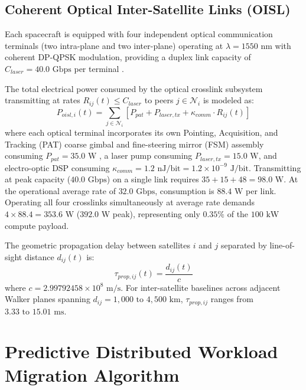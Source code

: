 \documentclass[journal]{IEEEtran}
\begin{document}
\subsection{Coherent Optical Inter-Satellite Links (OISL)}
Each spacecraft is equipped with four independent optical communication terminals (two intra-plane and two inter-plane) operating at $\lambda = 1550\text{ nm}$ with coherent DP-QPSK modulation, providing a duplex link capacity of $C_{laser} = 40.0\text{ Gbps}$ per terminal \cite{chaudhry2021laser, kaushal2017optical, artiga2025targeting, chaudhry2022optical, zhu2022laser}.

The total electrical power consumed by the optical crosslink subsystem transmitting at rates $R_{ij}(t) \le C_{laser}$ to peers $j \in \mathcal{N}_i$ is modeled as:
\begin{equation}
    P_{oisl,i}(t) = \sum_{j \in \mathcal{N}_i} \left[ P_{pat} + P_{laser,tx} + \kappa_{comm} \cdot R_{ij}(t) \right]
    \label{eq:oisl_power}
\end{equation}
where each optical terminal incorporates its own Pointing, Acquisition, and Tracking (PAT) coarse gimbal and fine-steering mirror (FSM) assembly consuming $P_{pat} = 35.0\text{ W}$ \cite{kaymak2018survey, baltaci2023investigation}, a laser pump consuming $P_{laser,tx} = 15.0\text{ W}$, and electro-optic DSP consuming $\kappa_{comm} = 1.2\text{ nJ/bit} = 1.2 \times 10^{-9}\text{ J/bit}$. Transmitting at peak capacity ($40.0\text{ Gbps}$) on a single link requires $35 + 15 + 48 = 98.0\text{ W}$. At the operational average rate of $32.0\text{ Gbps}$, consumption is $88.4\text{ W}$ per link. Operating all four crosslinks simultaneously at average rate demands $4 \times 88.4 = 353.6\text{ W}$ ($392.0\text{ W}$ peak), representing only $0.35\%$ of the $100\text{ kW}$ compute payload.

The geometric propagation delay between satellites $i$ and $j$ separated by line-of-sight distance $d_{ij}(t)$ is:
\begin{equation}
    \tau_{prop,ij}(t) = \frac{d_{ij}(t)}{c}
    \label{eq:propagation_delay}
\end{equation}
where $c = 2.99792458 \times 10^8\text{ m/s}$. For inter-satellite baselines across adjacent Walker planes spanning $d_{ij} = 1,000\text{ to }4,500\text{ km}$, $\tau_{prop,ij}$ ranges from $3.33\text{ to }15.01\text{ ms}$.

\section{Predictive Distributed Workload Migration Algorithm}
\end{document}
